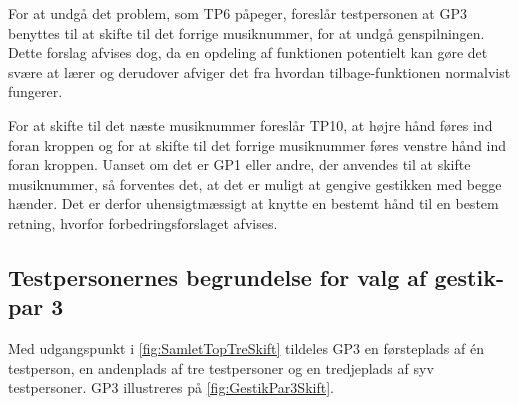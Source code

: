 For at undgå det problem, som TP6 påpeger, foreslår testpersonen at GP3 benyttes til at skifte til det forrige musiknummer, for at undgå genspilningen. Dette forslag afvises dog, da en opdeling af funktionen potentielt kan gøre det svære at lærer og derudover afviger det fra hvordan tilbage-funktionen normalvist fungerer. 

For at skifte til det næste musiknummer foreslår TP10, at højre hånd føres ind foran kroppen og for at skifte til det forrige musiknummer føres venstre hånd ind foran kroppen. Uanset om det er GP1 eller andre, der anvendes til at skifte musiknummer, så forventes det, at det er muligt at gengive gestikken med begge hænder. Det er derfor uhensigtmæssigt at knytte en bestemt hånd til en bestem retning, hvorfor forbedringsforslaget afvises.     
%
\subsection{Testpersonernes begrundelse for valg af gestik-par 3}
\label{TestresultaterValgAfGestikkerBegrundelseGP3Skift}
% 
Med udgangspunkt i \autoref{fig:SamletTopTreSkift} tildeles GP3 en førsteplads af én testperson, en andenplads af tre testpersoner og en tredjeplads af syv testpersoner. GP3 illustreres på \autoref{fig:GestikPar3Skift}. 

